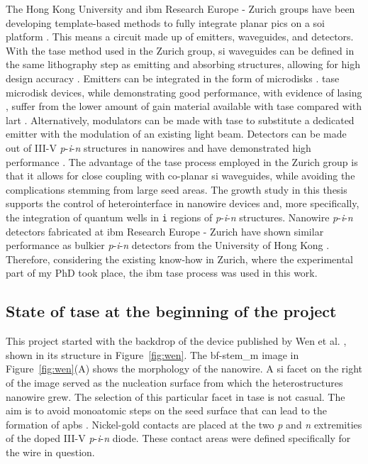 The Hong Kong University and \acs{ibm} Research Europe - Zurich groups have been developing template-based methods to fully integrate planar \acs{pic}s on a \acs{soi} platform \cite{Mauthe2020}. This means a circuit made up of emitters, waveguides, and detectors. With the \acs{tase} method used in the Zurich group, \acl{si} waveguides can be defined in the same lithography step as emitting and absorbing structures, allowing for high design accuracy \cite{Wen2022}. Emitters can be integrated in the form of microdisks \cite{Tiwari2020, Tiwari2021}. \Acs{tase} microdisk devices, while demonstrating good performance, with evidence of lasing \cite{Tiwari2020}, suffer from the lower amount of gain material available with \acs{tase} compared with \acs{lart} \cite{Huang2024}. Alternatively, modulators can be made with \acs{tase} \cite{Scherrer2022, Scherrer2024} to substitute a dedicated emitter with the modulation of an existing light beam. Detectors can be made out of III-V \textit{p}-\textit{i}-\textit{n} structures in nanowires and have demonstrated high performance \cite{Mauthe2020, Wen2022}. The advantage of the \acs{tase} process employed in the Zurich group is that it allows for close coupling with co-planar \acs{si} waveguides, while avoiding the complications stemming from large seed areas. The growth study in this thesis supports the control of heterointerface in nanowire devices and, more specifically, the integration of quantum wells in \texttt{i} regions of \textit{p}-\textit{i}-\textit{n} structures. Nanowire \textit{p}-\textit{i}-\textit{n} detectors fabricated at \acs{ibm} Research Europe - Zurich have shown similar performance as bulkier \textit{p}-\textit{i}-\textit{n} detectors from the University of Hong Kong \cite{Mauthe2020, Wen2022, Xue2021}. Therefore, considering the existing know-how in Zurich, where the experimental part of my PhD took place, the \acs{ibm} \acs{tase} process was used in this work.

\subsection{\texorpdfstring{State of \acs{tase} at the beginning of the project}{State of TASE at the beginning of the project}}

This project started with the backdrop of the device published by Wen et al. \cite{Wen2022}, shown in its structure in Figure~\ref{fig:wen}. The \acs{bf}-\acs{stem_m} image in Figure~\ref{fig:wen}(A) shows the morphology of the nanowire. A  \acf{si} facet on the right of the image served as the nucleation surface from which the heterostructures nanowire grew. The selection of this particular facet in \acs{tase} is not casual. The aim is to avoid monoatomic steps on the seed surface that can lead to the formation of \acs{apb}s \cite{Kunert2018}. Nickel-gold contacts are placed at the two \textit{p} and \textit{n} extremities of the doped III-V \textit{p}-\textit{i}-\textit{n} diode. These contact areas were defined specifically for the wire in question. 

